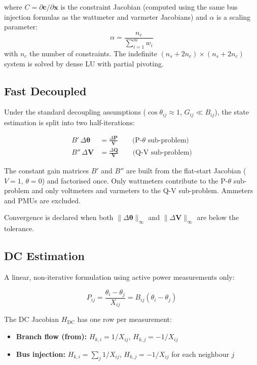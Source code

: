\documentclass[11pt,a4paper]{article}
\begin{document}
\noindent
where $C = \partial\mathbf{c}/\partial\mathbf{x}$ is the constraint
Jacobian (computed using the same bus injection formulas as the wattmeter
and varmeter Jacobians) and $\alpha$ is a scaling parameter:
\begin{equation}
  \alpha = \frac{n_c}{\sum_{i=1}^{m} w_i}
\end{equation}
with $n_c$ the number of constraints.  The indefinite $(n_s + 2n_c) \times
(n_s + 2n_c)$ system is solved by dense LU with partial pivoting.

\subsection{Fast Decoupled}\label{sec:fd}

Under the standard decoupling assumptions
($\cos\theta_{ij} \approx 1$, $G_{ij} \ll B_{ij}$), the state estimation
is split into two half-iterations:

\begin{align}
  B'\,\Delta\bm{\theta} &= \frac{\Delta\mathbf{P}}{\mathbf{V}}
    \qquad\text{(P-$\theta$ sub-problem)} \label{eq:fd-p} \\
  B''\,\Delta\mathbf{V} &= \frac{\Delta\mathbf{Q}}{\mathbf{V}}
    \qquad\text{(Q-V sub-problem)} \label{eq:fd-q}
\end{align}

The constant gain matrices $B'$ and $B''$ are built from the flat-start
Jacobian ($V=1$, $\theta=0$) and factorised once.  Only wattmeters
contribute to the P-$\theta$ sub-problem and only voltmeters and varmeters
to the Q-V sub-problem.  Ammeters and PMUs are excluded.

Convergence is declared when both $\|\Delta\bm{\theta}\|_\infty$
and $\|\Delta\mathbf{V}\|_\infty$ are below the tolerance.

\subsection{DC Estimation}\label{sec:dc}

A linear, non-iterative formulation using active power measurements only:

\begin{equation}
  P_{ij} = \frac{\theta_i - \theta_j}{X_{ij}} = B_{ij}(\theta_i - \theta_j)
\end{equation}

The DC Jacobian $H_\text{DC}$ has one row per measurement:

\begin{itemize}
  \item \textbf{Branch flow (from):} $H_{k,i} = 1/X_{ij}$,
        $H_{k,j} = -1/X_{ij}$
  \item \textbf{Bus injection:} $H_{k,i} = \sum_j 1/X_{ij}$,
        $H_{k,j} = -1/X_{ij}$ for each neighbour $j$
\end{itemize}
\end{document}
